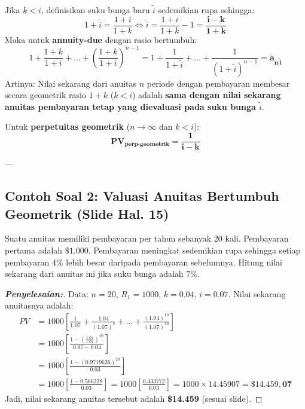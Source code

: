 \documentclass[11pt,a4paper]{article}
\begin{document}
Jika $k < i$, definisikan suku bunga baru $\tilde{i}$ sedemikian rupa sehingga:
\begin{equation}
    1 + \tilde{i} = \frac{1+i}{1+k} \iff \tilde{i} = \frac{1+i}{1+k} - 1 = \mathbf{\frac{i - k}{1 + k}}
\end{equation}
Maka untuk \textbf{annuity-due} dengan rasio bertumbuh:
\begin{equation}
    1 + \frac{1+k}{1+i} + \dots + \left(\frac{1+k}{1+i}\right)^{n-1} = 1 + \frac{1}{1+\tilde{i}} + \dots + \frac{1}{(1+\tilde{i})^{n-1}} = \mathbf{\ddot{a}_{\overline{n}|\tilde{i}}}
\end{equation}
Artinya: Nilai sekarang dari anuitas $n$ periode dengan pembayaran membesar secara geometrik rasio $1+k$ ($k < i$) adalah \textbf{sama dengan nilai sekarang anuitas pembayaran tetap yang dievaluasi pada suku bunga $\tilde{i}$}.

Untuk \textbf{perpetuitas geometrik} ($n \to \infty$ dan $k < i$):
\begin{equation}
    \mathbf{PV_{\text{perp-geometrik}} = \frac{1}{i - k}}
\end{equation}

---

\subsection{Contoh Soal 2: Valuasi Anuitas Bertumbuh Geometrik (Slide Hal. 15)}

\begin{examplebox}
Suatu anuitas memiliki pembayaran per tahun sebanyak 20 kali. Pembayaran pertama adalah $\$1.000$. Pembayaran meningkat sedemikian rupa sehingga setiap pembayaran $4\%$ lebih besar daripada pembayaran sebelumnya. Hitung nilai sekarang dari anuitas ini jika suku bunga adalah $7\%$.
\end{examplebox}

\begin{proof}[\textbf{Penyelesaian:}]
Data: $n = 20$, $R_1 = 1000$, $k = 0.04$, $i = 0.07$.
Nilai sekarang anuitasnya adalah:
\begin{align*}
    PV &= 1000 \left[ \frac{1}{1.07} + \frac{1.04}{(1.07)^2} + \dots + \frac{(1.04)^{19}}{(1.07)^{20}} \right] \\
       &= 1000 \left[ \frac{1 - \left(\frac{1.04}{1.07}\right)^{20}}{0.07 - 0.04} \right] \\
       &= 1000 \left[ \frac{1 - (0.9719626)^{20}}{0.03} \right] \\
       &= 1000 \left[ \frac{1 - 0.566228}{0.03} \right] = 1000 \left[ \frac{0.433772}{0.03} \right] = 1000 \times 14.45907 = \mathbf{\$14.459,07}
\end{align*}
Jadi, nilai sekarang anuitas tersebut adalah \textbf{\$14.459} (sesuai slide).
\end{proof}
\end{document}
